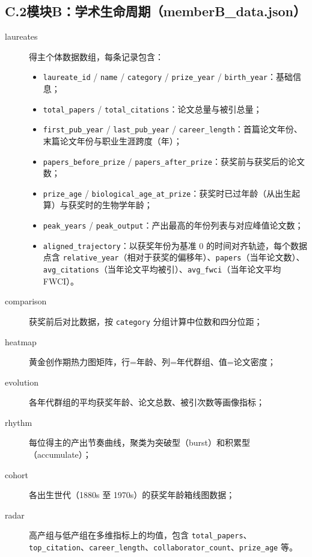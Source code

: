 \documentclass[UTF8]{CjC}
\theoremstyle{mystyle}
\begin{document}
{\subsection*{C.2\quad 模块B：学术生命周期（memberB\_data.json）}
\begin{description}
    \item[laureates] 得主个体数据数组，每条记录包含：
    \begin{itemize}
        \item \texttt{laureate\_id} / \texttt{name} / \texttt{category} / \texttt{prize\_year} / \texttt{birth\_year}：基础信息；
        \item \texttt{total\_papers} / \texttt{total\_citations}：论文总量与被引总量；
        \item \texttt{first\_pub\_year} / \texttt{last\_pub\_year} / \texttt{career\_length}：首篇论文年份、末篇论文年份与职业生涯跨度（年）；
        \item \texttt{papers\_before\_prize} / \texttt{papers\_after\_prize}：获奖前与获奖后的论文数；
        \item \texttt{prize\_age} / \texttt{biological\_age\_at\_prize}：获奖时已过年龄（从出生起算）与获奖时的生物学年龄；
        \item \texttt{peak\_years} / \texttt{peak\_output}：产出最高的年份列表与对应峰值论文数；
        \item \texttt{aligned\_trajectory}：以获奖年份为基准 0 的时间对齐轨迹，每个数据点含 \texttt{relative\_year}（相对于获奖的偏移年）、\texttt{papers}（当年论文数）、\texttt{avg\_citations}（当年论文平均被引）、\texttt{avg\_fwci}（当年论文平均 FWCI）。
    \end{itemize}
    \item[comparison] 获奖前后对比数据，按 \texttt{category} 分组计算中位数和四分位距；
    \item[heatmap] 黄金创作期热力图矩阵，行=年龄、列=年代群组、值=论文密度；
    \item[evolution] 各年代群组的平均获奖年龄、论文总数、被引次数等画像指标；
    \item[rhythm] 每位得主的产出节奏曲线，聚类为突破型（burst）和积累型（accumulate）；
    \item[cohort] 各出生世代（1880s 至 1970s）的获奖年龄箱线图数据；
    \item[radar] 高产组与低产组在多维指标上的均值，包含 \texttt{total\_papers}、\texttt{top\_citation}、\texttt{career\_length}、\texttt{collaborator\_count}、\texttt{prize\_age} 等。
\end{description}

}
\end{document}
